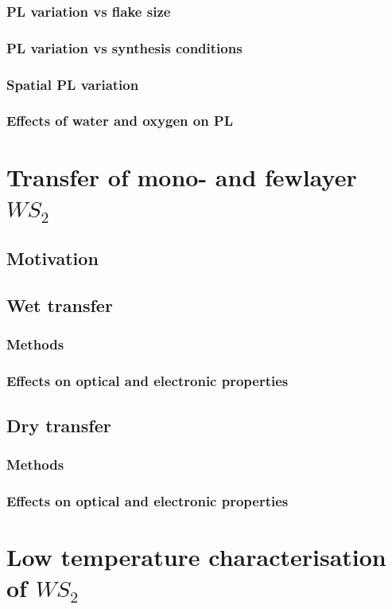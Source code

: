 \documentclass[12pt]{article}
\begin{document}
{		\subsubsection{PL variation vs flake size}
		\subsubsection{PL variation vs synthesis conditions}
		\subsubsection{Spatial PL variation}
		\subsubsection{Effects of water and oxygen on PL}
\section{Transfer of mono- and fewlayer $WS_2$}
	\subsection{Motivation}
	\subsection{Wet transfer}
		\subsubsection{Methods}
		\subsubsection{Effects on optical and electronic properties}
	\subsection{Dry transfer}
		\subsubsection{Methods}
		\subsubsection{Effects on optical and electronic properties}
\section{Low temperature characterisation of $WS_2$}
}
\end{document}
